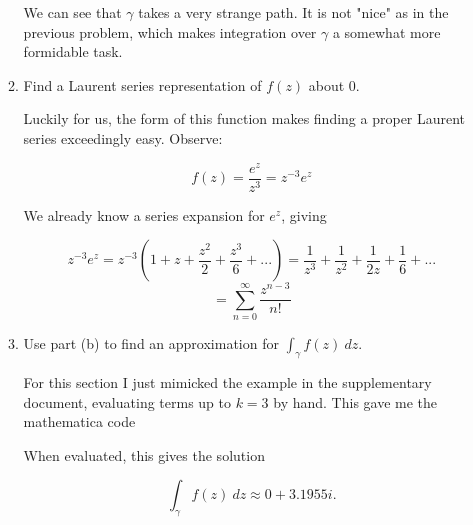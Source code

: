 \documentclass{article}
\begin{document}
\begin{enumerate}
\begin{enumerate}
		We can see that $\gamma$ takes a very strange path. It is not "nice" as in the previous problem, which makes integration over $\gamma$ a somewhat more formidable task.
		
		\item Find a Laurent series representation of $f(z)$ about 0.
		
		Luckily for us, the form of this function makes finding a proper Laurent series exceedingly easy. Observe:
		
		\[f(z)=\frac{e^z}{z^3}=z^{-3}e^z \]
		
		We already know a series expansion for $e^z$, giving
		
		\[z^{-3}e^z=z^{-3}\left( 1+z+\frac{z^2}{2}+\frac{z^3}{6}+...  \right)=\frac{1}{z^3}+\frac{1}{z^2}+\frac{1}{2z}+\frac{1}{6}+... \]
		\[=\sum_{n=0}^{\infty}\frac{z^{n-3}}{n!} \]
		
		\item Use part (b) to find an approximation for $\int_{\gamma}f(z)\ dz$.
		
		For this section I just mimicked the example in the supplementary document, evaluating terms up to $k=3$ by hand. This gave me the mathematica code
		
		
		
		When evaluated, this gives the solution
		
		\[\int_{\gamma}f(z)\ dz \approx 0+3.1955i.  \]
	\end{enumerate}
	
\end{enumerate}

\end{document}
